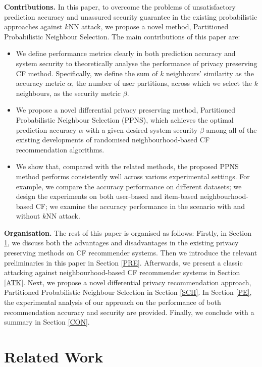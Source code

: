 \documentclass[11pt]{article}
\begin{document}
\textbf{Contributions.} In this paper, to overcome the problems of unsatisfactory prediction accuracy and unassured security guarantee in the existing probabilistic approaches against $k$NN attack, we propose a novel method, Partitioned Probabilistic Neighbour Selection. The main contributions of this paper are:
\begin{itemize}
\item We define performance metrics clearly in both prediction accuracy and system security to theoretically analyse the performance of privacy preserving CF method. Specifically, we define the sum of $k$ neighbours' similarity as the accuracy metric $\alpha$, the number of user partitions, across which we select the $k$ neighbours, as the security metric $\beta$.
\item We propose a novel differential privacy preserving method, Partitioned Probabilistic Neighbour Selection (PPNS), which achieves the optimal prediction accuracy $\alpha$ with a given desired system security $\beta$ among all of the existing developments of randomised neighbourhood-based CF recommendation algorithms.
\item We show that, compared with the related methods, the proposed PPNS method performs consistently well across various experimental settings. For example, we compare the accuracy performance on different datasets; we design the experiments on both user-based and item-based neighbourhood-based CF; we examine the accuracy performance in the scenario with and without $k$NN attack.
\end{itemize}
\textbf{Organisation.} The rest of this paper is organised as follows: Firstly, in Section \ref{RW}, we discuss both the advantages and disadvantages in the existing privacy preserving methods on CF recommender systems. Then we introduce the relevant preliminaries in this paper in Section \ref{PRE}. Afterwards, we present a classic attacking against neighbourhood-based CF recommender systems in Section \ref{ATK}. Next, we propose a novel differential privacy recommendation approach, Partitioned Probabilistic Neighbour Selection in Section \ref{SCH}. In Section \ref{PE}, the experimental analysis of our approach on the performance of both recommendation accuracy and security are provided. Finally, we conclude with a summary in Section \ref{CON}. 


\section{Related Work}
\label{RW}
\end{document}
